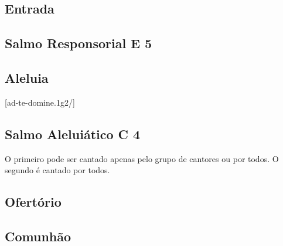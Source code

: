 
\subsection{Entrada}\label{subsection:proprium-sanctorum/in-nativitate-sancti-ioannes-baptistae/introitus}

\AllowPageFlush

\subsection[Salmo Responsorial]{Salmo Responsorial \textmd{E 5}}\label{subsection:proprium-sanctorum/in-nativitate-sancti-ioannes-baptistae/psalmus-responsorius}

\subsection{Aleluia}\label{subsection:proprium-sanctorum/in-nativitate-sancti-ioannes-baptistae/alleluia}
[ad-te-domine.1g2/]

\AllowPageFlush

\subsection[Salmo Aleluiático]{Salmo Aleluiático \textmd{C 4}}\label{subsection:proprium-sanctorum/in-nativitate-sancti-ioannes-baptistae/psalmus-alleluiaticus}
\begin{rubrica}
  O primeiro {\normalfont\Rbar} pode ser cantado apenas pelo grupo de cantores ou por todos. O segundo {\normalfont\Rbar} é cantado por todos.
\end{rubrica}

\AllowPageFlush

\subsection{Ofertório}\label{subsection:proprium-sanctorum/in-nativitate-sancti-ioannes-baptistae/offertorium}

\AllowPageFlush

\subsection{Comunhão}\label{subsection:proprium-sanctorum/in-nativitate-sancti-ioannes-baptistae/communio}
